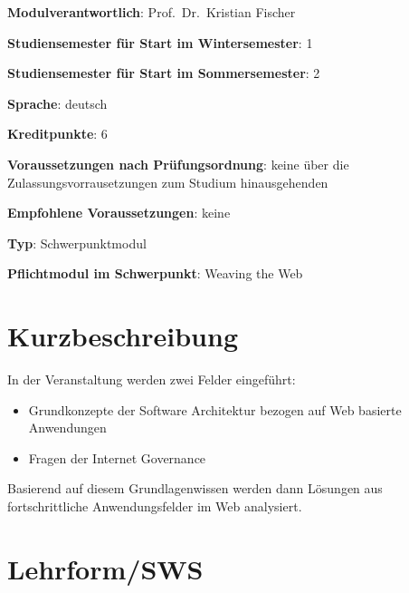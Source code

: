 \begin{modulHead}
\textbf{Modulverantwortlich}: Prof.~Dr.~Kristian
Fischer
\end{modulHead}
\begin{modulHead}
\textbf{Studiensemester für
Start im Wintersemester}:
1
\end{modulHead}
\begin{modulHead}
\textbf{Studiensemester für Start
im Sommersemester}:
2
\end{modulHead}
\begin{modulHead}
\textbf{Sprache}:
deutsch
\end{modulHead}
\begin{modulHead}
\textbf{Kreditpunkte}:
6
\end{modulHead}
\begin{modulHead}
\textbf{Voraussetzungen nach
Prüfungsordnung}: keine über die Zulassungsvorrausetzungen zum Studium
hinausgehenden
\end{modulHead}
\begin{modulHead}
\textbf{Empfohlene
Voraussetzungen}: keine
\end{modulHead}
\begin{modulHead}
\textbf{Typ}:
Schwerpunktmodul
\end{modulHead}
\begin{modulHead}
\textbf{Pflichtmodul
im Schwerpunkt}: Weaving the Web
\end{modulHead}


\section*{Kurzbeschreibung\label{/mi-2017/modulbeschreibungen-master/MA_WTW_Modul_Web-Architekturen}}\label{kurzbeschreibungpathlabelmi-2017modulbeschreibungen-mastermaux5fwtwux5fmodulux5fweb-architekturen}

In der Veranstaltung werden zwei Felder eingeführt:

\begin{itemize}
\tightlist
\item
  Grundkonzepte der Software Architektur bezogen auf Web basierte
  Anwendungen
\item
  Fragen der Internet Governance
\end{itemize}

Basierend auf diesem Grundlagenwissen werden dann Lösungen aus
fortschrittliche Anwendungsfelder im Web analysiert.

\section*{Lehrform/SWS\label{/mi-2017/modulbeschreibungen-master/MA_WTW_Modul_Web-Architekturen}}\label{lehrformswspathlabelmi-2017modulbeschreibungen-mastermaux5fwtwux5fmodulux5fweb-architekturen}

